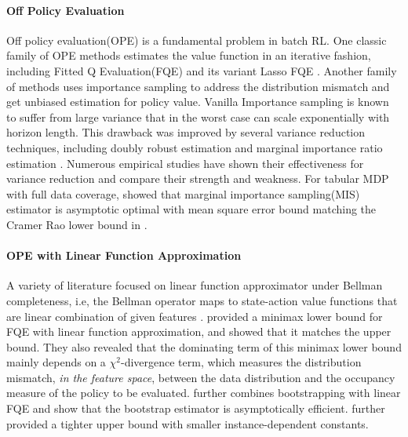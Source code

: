 \documentclass{article}
\numberwithin{equation}{section}
\theoremstyle{plain}
\theoremstyle{definition}
\theoremstyle{remark}
\begin{document}
\paragraph{Off Policy Evaluation} Off policy evaluation(OPE) is a fundamental problem in batch RL. One classic family of OPE methods estimates the value function in an iterative fashion, including Fitted Q Evaluation(FQE) \citep{munos2008finite,le2019batch} and its variant Lasso FQE \citep{hao2021sparse}. Another family of methods uses importance sampling to address the distribution mismatch and get unbiased estimation for policy value\citep{precup2000eligibility}. Vanilla Importance sampling is known to suffer from large variance that in the worst case can scale exponentially with horizon length\citep{yin2020asymptotically,jiang2016doubly}. This drawback was improved by several variance reduction techniques, including doubly robust estimation \citep{jiang2016doubly} and marginal importance ratio estimation \citep{xie2019towards}. Numerous empirical studies have shown their effectiveness for variance reduction and compare their strength and weakness\citep{thomas2016data,li2015toward}. For tabular MDP with full data coverage, \citep{yin2020asymptotically} showed that marginal importance sampling(MIS) estimator is asymptotic optimal with mean square error bound matching the Cramer Rao lower bound in \citep{jiang2016doubly}.

\paragraph{OPE with Linear Function Approximation}   A variety of literature focused on linear function approximator under Bellman completeness, i.e, the Bellman operator maps to state-action value functions that are linear combination of given features \citep{bootstrap,duan2020minimax,wang2019optimism}. \citep{duan2020minimax} provided a minimax lower bound for FQE with linear function approximation, and showed that it matches the upper bound. They also revealed that the dominating term of this minimax lower bound mainly depends on a $\chi^2$-divergence term, which measures the distribution mismatch, {\it in the feature space}, between the data distribution and the occupancy measure of the policy to be evaluated. \citep{bootstrap} further combines bootstrapping with linear FQE and show that the bootstrap estimator is asymptotically efficient. \citep{min2021variance} further provided a tighter upper bound with smaller instance-dependent constants.
\end{document}
